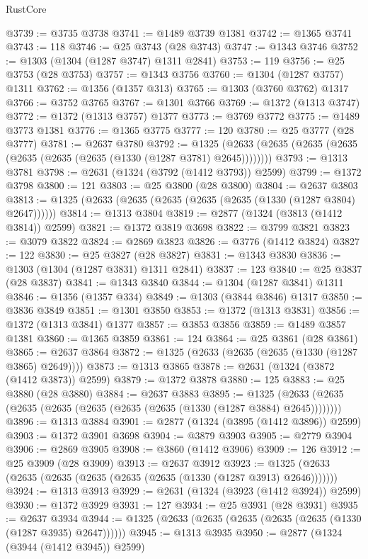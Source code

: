 \begin{lexlean}{RustCore}
\begin{coremodule}
@3739 := @3735 @3738
@3741 := @1489 @3739 @1381
@3742 := @1365 @3741
@3743 := 118
@3746 := @25 @3743 (@28 @3743)
@3747 := @1343 @3746
@3752 := @1303 (@1304 (@1287 @3747) @1311 @2841)
@3753 := 119
@3756 := @25 @3753 (@28 @3753)
@3757 := @1343 @3756
@3760 := @1304 (@1287 @3757) @1311
@3762 := @1356 (@1357 @313)
@3765 := @1303 (@3760 @3762) @1317
@3766 := @3752 @3765
@3767 := @1301 @3766
@3769 := @1372 (@1313 @3747)
@3772 := @1372 (@1313 @3757) @1377
@3773 := @3769 @3772
@3775 := @1489 @3773 @1381
@3776 := @1365 @3775
@3777 := 120
@3780 := @25 @3777 (@28 @3777)
@3781 := @2637 @3780
@3792 := @1325 (@2633 (@2635 (@2635 (@2635 (@2635 (@2635 (@2635 (@1330 (@1287 @3781) @2645))))))))
@3793 := @1313 @3781
@3798 := @2631 (@1324 (@3792 (@1412 @3793)) @2599)
@3799 := @1372 @3798
@3800 := 121
@3803 := @25 @3800 (@28 @3800)
@3804 := @2637 @3803
@3813 := @1325 (@2633 (@2635 (@2635 (@2635 (@2635 (@1330 (@1287 @3804) @2647))))))
@3814 := @1313 @3804
@3819 := @2877 (@1324 (@3813 (@1412 @3814)) @2599)
@3821 := @1372 @3819 @3698
@3822 := @3799 @3821
@3823 := @3079 @3822
@3824 := @2869 @3823
@3826 := @3776 (@1412 @3824)
@3827 := 122
@3830 := @25 @3827 (@28 @3827)
@3831 := @1343 @3830
@3836 := @1303 (@1304 (@1287 @3831) @1311 @2841)
@3837 := 123
@3840 := @25 @3837 (@28 @3837)
@3841 := @1343 @3840
@3844 := @1304 (@1287 @3841) @1311
@3846 := @1356 (@1357 @334)
@3849 := @1303 (@3844 @3846) @1317
@3850 := @3836 @3849
@3851 := @1301 @3850
@3853 := @1372 (@1313 @3831)
@3856 := @1372 (@1313 @3841) @1377
@3857 := @3853 @3856
@3859 := @1489 @3857 @1381
@3860 := @1365 @3859
@3861 := 124
@3864 := @25 @3861 (@28 @3861)
@3865 := @2637 @3864
@3872 := @1325 (@2633 (@2635 (@2635 (@1330 (@1287 @3865) @2649))))
@3873 := @1313 @3865
@3878 := @2631 (@1324 (@3872 (@1412 @3873)) @2599)
@3879 := @1372 @3878
@3880 := 125
@3883 := @25 @3880 (@28 @3880)
@3884 := @2637 @3883
@3895 := @1325 (@2633 (@2635 (@2635 (@2635 (@2635 (@2635 (@2635 (@1330 (@1287 @3884) @2645))))))))
@3896 := @1313 @3884
@3901 := @2877 (@1324 (@3895 (@1412 @3896)) @2599)
@3903 := @1372 @3901 @3698
@3904 := @3879 @3903
@3905 := @2779 @3904
@3906 := @2869 @3905
@3908 := @3860 (@1412 @3906)
@3909 := 126
@3912 := @25 @3909 (@28 @3909)
@3913 := @2637 @3912
@3923 := @1325 (@2633 (@2635 (@2635 (@2635 (@2635 (@2635 (@1330 (@1287 @3913) @2646)))))))
@3924 := @1313 @3913
@3929 := @2631 (@1324 (@3923 (@1412 @3924)) @2599)
@3930 := @1372 @3929
@3931 := 127
@3934 := @25 @3931 (@28 @3931)
@3935 := @2637 @3934
@3944 := @1325 (@2633 (@2635 (@2635 (@2635 (@2635 (@1330 (@1287 @3935) @2647))))))
@3945 := @1313 @3935
@3950 := @2877 (@1324 (@3944 (@1412 @3945)) @2599)

\end{coremodule}
\end{lexlean}
